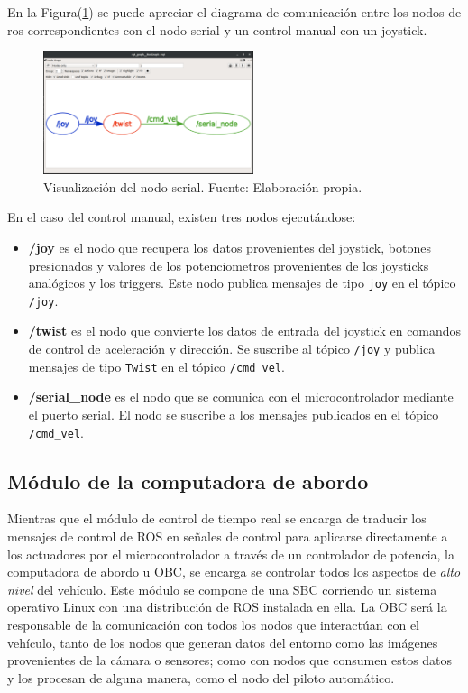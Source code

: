         En la Figura(\ref{fig:joy_serial}) se puede apreciar el diagrama de comunicación entre los nodos de ros correspondientes con el nodo serial 
        y un control manual con un joystick.


        \begin{figure}[!h] 
            \centering
            \includegraphics[width=0.55\textwidth]{img/joy_serial}
            \caption[Visualización del nodo serial]{Visualización del nodo serial. Fuente: Elaboración propia. }
            \label{fig:joy_serial}
        \end{figure}
        
        En el caso del control manual, existen tres nodos ejecutándose:
        \begin{itemize}
            \item \textbf{/joy} es el nodo que recupera los datos provenientes del joystick, botones presionados y valores de los potenciometros provenientes de los joysticks analógicos y los triggers. Este nodo publica mensajes de tipo \lstinline{joy} en el tópico \lstinline{/joy}.
            \item \textbf{/twist} es el nodo que convierte los datos de entrada del joystick en comandos de control de aceleración y dirección. Se suscribe al tópico \lstinline{/joy} y publica mensajes de tipo \lstinline{Twist} en el tópico \lstinline{/cmd_vel}.
            \item \textbf{/serial\_node} es el nodo que se comunica con el microcontrolador mediante el puerto serial. El nodo se suscribe a los mensajes publicados en el tópico \lstinline{/cmd_vel}.
        \end{itemize}

    \subsection{Módulo de la computadora de abordo}
    Mientras que el módulo de control de tiempo real se encarga de traducir los mensajes de control de ROS en señales de control 
    para aplicarse directamente a los actuadores por el microcontrolador a través de un controlador de potencia, la computadora 
    de abordo u OBC, se encarga se controlar todos los aspectos de \textit{alto nivel} del vehículo. Este módulo se compone de 
    una SBC corriendo un sistema operativo Linux con una distribución de ROS instalada en ella. La OBC será la responsable de 
    la comunicación con todos los nodos que interactúan con el vehículo, tanto  de los nodos que generan datos del entorno como 
    las imágenes provenientes de la cámara o sensores; como con nodos que consumen estos datos y los procesan de alguna manera, 
    como el nodo del piloto automático. 

